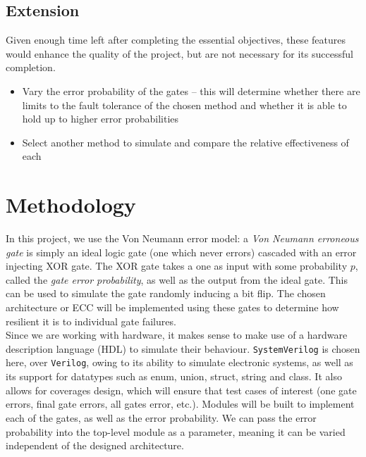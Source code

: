 \documentclass[12pt,a4paper]{article}
\begin{document}
\subsection{Extension}
Given enough time left after completing the essential objectives, these features would enhance the quality of the 
project, but are not necessary for its successful completion.
\begin{itemize}
    \item Vary the error probability of the gates -- this will determine whether there are limits to the fault 
    tolerance of the chosen method and whether it is able to hold up to higher error probabilities
    \item Select another method to simulate and compare the relative effectiveness of each
\end{itemize}


\section{Methodology} \label{sec:meth}
In this project, we use the Von Neumann error model: a \emph{Von Neumann erroneous gate} is simply an ideal logic 
gate (one which never errors) cascaded with an error injecting XOR gate. The XOR gate takes a one as input with some 
probability $p$, called the \emph{gate error probability}, as well as the output from the ideal gate. \cite{ref2} 
This can be used to simulate the gate randomly inducing a bit flip. The chosen architecture or ECC will be 
implemented using these gates to determine how resilient it is to individual gate failures. \\

\noindent Since we are working with hardware, it makes sense to make use of a hardware description language (HDL) to 
simulate their behaviour. \texttt{SystemVerilog} is chosen here, over \texttt{Verilog}, owing to its ability to 
simulate electronic systems, as well as its support for datatypes such as enum, union, struct, string and class. It 
also allows for coverages design, which will ensure that test cases of interest (one gate errors, final gate errors, 
all gates error, etc.). Modules will be built to implement each of the gates, as well as the error probability. We 
can pass the error probability into the top-level module as a parameter, meaning it can be varied independent of the 
designed architecture. \\
\end{document}
